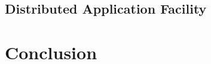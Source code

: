 \documentclass[aspectratio=169]{beamer}
\begin{document}
\subsection{Distributed Application Facility}

\section{Conclusion}
\end{document}
